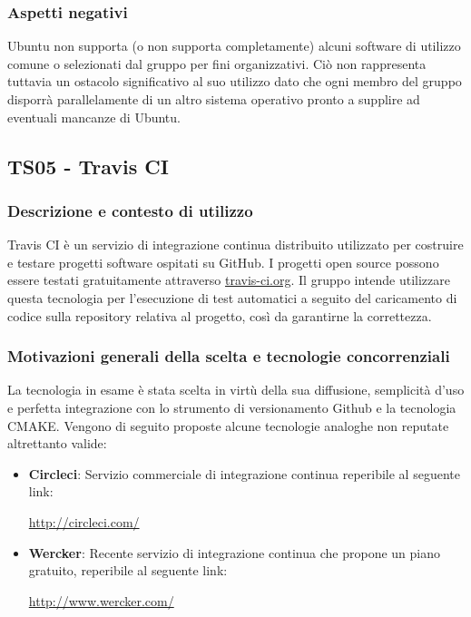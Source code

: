 \documentclass[./../Technology Baseline.tex]{subfiles}
\begin{document}
\subsubsection{Aspetti negativi}
Ubuntu non supporta (o non supporta completamente) alcuni software di utilizzo comune o selezionati dal gruppo per fini organizzativi. Ciò non rappresenta tuttavia un ostacolo significativo al suo utilizzo dato che ogni membro del gruppo disporrà parallelamente di un altro sistema operativo pronto a supplire ad eventuali mancanze di Ubuntu.  

\subsection{TS05 - Travis CI}

\subsubsection{Descrizione e contesto di utilizzo}
Travis CI è un servizio di integrazione continua distribuito utilizzato per costruire e testare progetti software ospitati su GitHub. I progetti open source possono essere testati gratuitamente attraverso \url{travis-ci.org}. Il gruppo intende utilizzare questa tecnologia per l'esecuzione di test automatici a seguito del caricamento di codice sulla repository relativa al progetto, così da garantirne la correttezza.

\subsubsection{Motivazioni generali della scelta e tecnologie concorrenziali}
La tecnologia in esame è stata scelta in virtù della sua diffusione, semplicità d'uso e perfetta integrazione con lo strumento di versionamento Github e la tecnologia CMAKE. Vengono di seguito proposte alcune tecnologie analoghe non reputate altrettanto valide:

\begin{itemize}
	\item \textbf{Circleci}: Servizio commerciale di integrazione continua reperibile al seguente link:
	\begin{center}
		\url{http://circleci.com/}
	\end{center}

	\item \textbf{Wercker}: Recente servizio di integrazione continua che propone un piano gratuito, reperibile al seguente link:
	\begin{center}
		\url{http://www.wercker.com/}
	\end{center}
\end{itemize}
\end{document}
